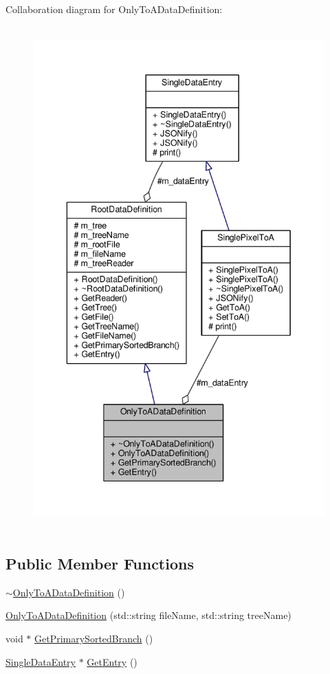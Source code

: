 Collaboration diagram for Only\+To\+A\+Data\+Definition\+:\nopagebreak
\begin{figure}[H]
\begin{center}
\leavevmode
\includegraphics[height=550pt]{classOnlyToADataDefinition__coll__graph}
\end{center}
\end{figure}
\subsection*{Public Member Functions}
\begin{DoxyCompactItemize}
\item 
\hyperlink{classOnlyToADataDefinition_ac3392db2f04c84cfce35bbf12f287357}{$\sim$\+Only\+To\+A\+Data\+Definition} ()
\item 
\hyperlink{classOnlyToADataDefinition_aee47039c5d1c4c8714815e0253fca3e3}{Only\+To\+A\+Data\+Definition} (std\+::string file\+Name, std\+::string tree\+Name)
\item 
void $\ast$ \hyperlink{classOnlyToADataDefinition_af2025f39b59dc8bd50a281f5034ed47a}{Get\+Primary\+Sorted\+Branch} ()
\item 
\hyperlink{classSingleDataEntry}{Single\+Data\+Entry} $\ast$ \hyperlink{classOnlyToADataDefinition_ab2f4346c01cf342390c392cf1e36eebe}{Get\+Entry} ()
\end{DoxyCompactItemize}
